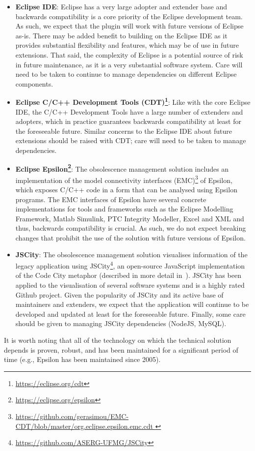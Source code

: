 \documentclass{llncs}
\begin{document}
\begin{itemize}
\item \textbf{Eclipse IDE}: Eclipse has a very large adopter and extender base and backwards compatibility is a core priority of the Eclipse development team. As such, we expect that the plugin will work with future versions of Eclipse as-is. There may be added benefit to building on the Eclipse IDE as it provides substantial flexibility and features, which may be of use in future extensions. That said, the complexity of Eclipse is a potential source of risk in future maintenance, as it is a very substantial software system. Care will need to be taken to continue to manage dependencies on different Eclipse components.

\item \textbf{Eclipse C/C++ Development Tools (CDT)\footnote{\url{https://eclipse.org/cdt}}}: Like with the core Eclipse IDE, the C/C++ Development Tools have a large number of extenders and adopters, which in practice guarantees backwards compatibility at least for the foreseeable future. Similar concerns to the Eclipse IDE about future extensions should be raised with CDT; care will need to be taken to manage dependencies.

\item \textbf{Eclipse Epsilon\footnote{\url{https://eclipse.org/epsilon}}}: The obsolescence management solution includes an implementation of the model connectivity interfaces (EMC)\footnote{\url{https://github.com/gerasimou/EMC-CDT/blob/master/org.eclipse.epsilon.emc.cdt }} of Epsilon, which exposes C/C++ code in a form that can be analysed using Epsilon programs. The EMC interfaces of Epsilon have several concrete implementations for tools and frameworks such as the Eclipse Modelling Framework, Matlab Simulink, PTC Integrity Modeller, Excel and XML and thus, backwards compatibility is crucial. As such, we do not expect breaking changes that prohibit the use of the solution with future versions of Epsilon.

\item \textbf{JSCity}: The obsolescence management solution visualises 
information of the legacy application using 
JSCity\footnote{\url{https://github.com/ASERG-UFMG/JSCity}}, an open-source 
JavaScript implementation of the Code City metaphor (described in more detail 
in~\cite{gerasimou17}). JSCity has been applied to the visualisation of 
several software systems and is a highly rated Github project. 
Given the popularity of JSCity and its active base of maintainers and 
extenders, we expect that the application will continue to be developed and 
updated at least for the foreseeable future. Finally, some care should be given 
to managing JSCity dependencies (NodeJS, MySQL).


\end{itemize}
It is worth noting that all of the technology on which the technical solution depends is proven, robust, and has been maintained for a significant period of time (e.g., Epsilon has been maintained since 2005).
 
\end{document}
